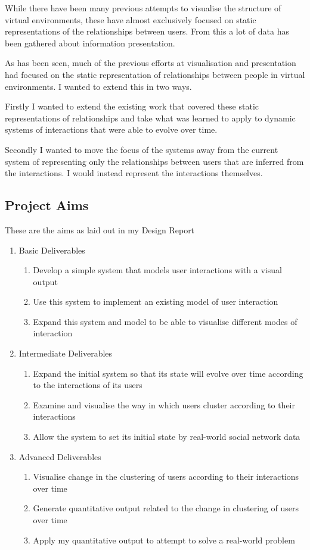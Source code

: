 \documentclass[12pt,a4paper]{article}
\begin{document}
While there have been many previous attempts to visualise the structure of virtual environments, these have almost exclusively focused on static representations of the relationships between users. From this a lot of data has been gathered about information presentation.

As has been seen, much of the previous efforts at visualisation and presentation had focused on the static representation of relationships between people in virtual environments. I wanted to extend this in two ways.

Firstly I wanted to extend the existing work that covered these static representations of relationships and take what was learned to apply to dynamic systems of interactions that were able to evolve over time.

Secondly I wanted to move the focus of the systems away from the current system of representing only the relationships between users that are inferred from the interactions. I would instead represent the interactions themselves.

\subsection{Project Aims}

These are the aims as laid out in my Design Report

\begin{enumerate}
\item Basic Deliverables
\begin{enumerate}
\item Develop a simple system that models user interactions with a visual output
\item Use this system to implement an existing model of user interaction
\item Expand this system and model to be able to visualise different modes of interaction
\end{enumerate}
\item Intermediate Deliverables
\begin{enumerate}
\item Expand the initial system so that its state will evolve over time according to the interactions of its users
\item Examine and visualise the way in which users cluster according to their interactions
\item Allow the system to set its initial state by real-world social network data
\end{enumerate}
\item Advanced Deliverables
\begin{enumerate}
\item Visualise change in the clustering of users according to their interactions over time
\item Generate quantitative output related to the change in clustering of users over time
\item Apply my quantitative output to attempt to solve a real-world problem
\end{enumerate}
\end{enumerate}
\end{document}
